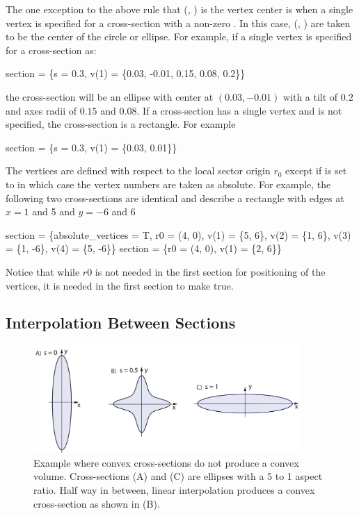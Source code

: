 The one exception to the above rule that (, ) is the vertex center is when a single
vertex  is specified for a cross-section with a non-zero . In this case,
(, ) are taken to be the center of the circle or ellipse. For example, if a single
vertex is specified for a cross-section as:
\begin{example}
  section = \{s = 0.3, v(1) = \{0.03, -0.01, 0.15, 0.08, 0.2\}\}
\end{example}
the cross-section will be an ellipse with center at $(0.03, -0.01)$ with a tilt of $0.2$ and axes
radii of $0.15$ and $0.08$. If a cross-section has a single vertex and  is not
specified, the cross-section is a rectangle. For example
\begin{example}
  section = \{s = 0.3, v(1) = \{0.03, 0.01\}\}
\end{example}

The vertices are defined with respect to the local sector origin $r_0$ except if
 is set to  in which case the vertex numbers are taken as absolute.
For example, the following two cross-sections are identical and describe a rectangle with edges at
$x = 1$ and 5 and $y = -6$ and 6
\begin{example}
  section = \{absolute_vertices = T, r0 = (4, 0), 
                  v(1) = \{5, 6\}, v(2) = \{1, 6\}, v(3) = \{1, -6\}, v(4) = \{5, -6\}\}
  section = \{r0 = (4, 0), v(1) = \{2, 6\}\}
\end{example}
Notice that while $r0$ is not needed in the first section for positioning of the vertices, it is
needed in the first section to make  true.

\subsection{Interpolation Between Sections}
\label{s:wall.interpolation}

\begin{figure}[tb]
  \centering
  \includegraphics[width=4in]{concave-capillary.pdf}
  \caption[Convex cross-sections do not guarantee a convex volume.]
{Example where convex cross-sections do not produce a convex volume.  Cross-sections (A) and (C) are
ellipses with a 5 to 1 aspect ratio.  Half way in between, linear interpolation produces a convex
cross-section as shown in (B).}
  \label{f:concave.capillary}
\end{figure}

